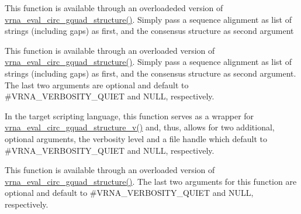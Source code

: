 \begin{DoxyRefList}
\item[\label{wrappers__wrappers000042}%
\Hypertarget{wrappers__wrappers000042}%
Global \hyperlink{group__eval_gac673ebb9ae2a29f54d201e2ac5b85540}{vrna\+\_\+eval\+\_\+circ\+\_\+gquad\+\_\+consensus\+\_\+structure} (const char $\ast$$\ast$alignment, const char $\ast$structure)]This function is available through an overloadeded version of \hyperlink{group__eval_ga9dba2fc5d7e6ad1359a7c2f350589c0e}{vrna\+\_\+eval\+\_\+circ\+\_\+gquad\+\_\+structure()}. Simply pass a sequence alignment as list of strings (including gaps) as first, and the consensus structure as second argument  
\item[\label{wrappers__wrappers000052}%
\Hypertarget{wrappers__wrappers000052}%
Global \hyperlink{group__eval_gaecd3e17292a0b3927277434019a5e187}{vrna\+\_\+eval\+\_\+circ\+\_\+gquad\+\_\+consensus\+\_\+structure\+\_\+v} (const char $\ast$$\ast$alignment, const char $\ast$structure, int verbosity\+\_\+level, F\+I\+LE $\ast$file)]This function is available through an overloaded version of \hyperlink{group__eval_ga9dba2fc5d7e6ad1359a7c2f350589c0e}{vrna\+\_\+eval\+\_\+circ\+\_\+gquad\+\_\+structure()}. Simply pass a sequence alignment as list of strings (including gaps) as first, and the consensus structure as second argument. The last two arguments are optional and default to \#\+V\+R\+N\+A\+\_\+\+V\+E\+R\+B\+O\+S\+I\+T\+Y\+\_\+\+Q\+U\+I\+ET and N\+U\+LL, respectively.  
\item[\label{wrappers__wrappers000038}%
\Hypertarget{wrappers__wrappers000038}%
Global \hyperlink{group__eval_ga9dba2fc5d7e6ad1359a7c2f350589c0e}{vrna\+\_\+eval\+\_\+circ\+\_\+gquad\+\_\+structure} (const char $\ast$string, const char $\ast$structure)]In the target scripting language, this function serves as a wrapper for \hyperlink{group__eval_gab96a6c59923ff06c35f8c2fd2c239727}{vrna\+\_\+eval\+\_\+circ\+\_\+gquad\+\_\+structure\+\_\+v()} and, thus, allows for two additional, optional arguments, the verbosity level and a file handle which default to \#\+V\+R\+N\+A\+\_\+\+V\+E\+R\+B\+O\+S\+I\+T\+Y\+\_\+\+Q\+U\+I\+ET and N\+U\+LL, respectively.  
\item[\label{wrappers__wrappers000048}%
\Hypertarget{wrappers__wrappers000048}%
Global \hyperlink{group__eval_gab96a6c59923ff06c35f8c2fd2c239727}{vrna\+\_\+eval\+\_\+circ\+\_\+gquad\+\_\+structure\+\_\+v} (const char $\ast$string, const char $\ast$structure, int verbosity\+\_\+level, F\+I\+LE $\ast$file)]This function is available through an overloaded version of \hyperlink{group__eval_ga9dba2fc5d7e6ad1359a7c2f350589c0e}{vrna\+\_\+eval\+\_\+circ\+\_\+gquad\+\_\+structure()}. The last two arguments for this function are optional and default to \#\+V\+R\+N\+A\+\_\+\+V\+E\+R\+B\+O\+S\+I\+T\+Y\+\_\+\+Q\+U\+I\+ET and N\+U\+LL, respectively.  

\end{DoxyRefList}

